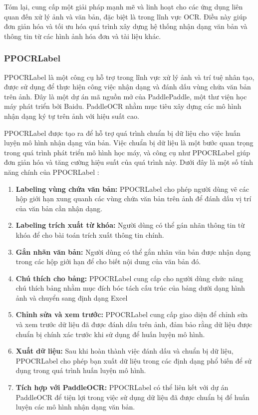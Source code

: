 Tóm lại, cung cấp một giải pháp mạnh mẽ và linh hoạt cho các ứng dụng liên quan đến xử lý ảnh và văn bản, đặc biệt là trong lĩnh vực OCR. Điều này giúp đơn giản hóa và tối ưu hóa quá trình xây dựng hệ thống nhận dạng văn bản và thông tin từ các hình ảnh hóa đơn và tài liệu khác.

\subsubsection{PPOCRLabel}
PPOCRLabel là một công cụ hỗ trợ trong lĩnh vực xử lý ảnh và trí tuệ nhân tạo, được sử dụng để thực hiện công việc nhận dạng và đánh dấu vùng chứa văn bản trên ảnh. Đây là một dự án mã nguồn mở của PaddlePaddle, một thư viện học máy phát triển bởi Baidu. PaddleOCR nhằm mục tiêu xây dựng các mô hình nhận dạng ký tự trên ảnh với hiệu suất cao.

PPOCRLabel được tạo ra để hỗ trợ quá trình chuẩn bị dữ liệu cho việc huấn luyện mô hình nhận dạng văn bản. Việc chuẩn bị dữ liệu là một bước quan trọng trong quá trình phát triển mô hình học máy, và công cụ như PPOCRLabel giúp đơn giản hóa và tăng cường hiệu suất của quá trình này. Dưới đây là một số tính năng chính của PPOCRLabel \cite{ppocrlabel}:
\begin{enumerate}
    \item \textbf{Labeling vùng chứa văn bản:} PPOCRLabel cho phép người dùng vẽ các hộp giới hạn xung quanh các vùng chứa văn bản trên ảnh để đánh dấu vị trí của văn bản cần nhận dạng.
    \item \textbf{Labeling trích xuất từ khóa:} Người dùng có thể gán nhãn thông tin từ khóa để cho bài toán trích xuất thông tin chính.
    \item \textbf{Gắn nhãn văn bản:} Người dùng có thể gắn nhãn văn bản được nhận dạng trong các hộp giới hạn để cho biết nội dung của văn bản đó.
    \item \textbf{Chú thích cho bảng:} PPOCRLabel cung cấp cho người dùng chức năng chú thích bảng nhằm mục đích bóc tách cấu trúc của bảng dưới dạng hình ảnh và chuyển sang định dạng Excel
    \item \textbf{Chỉnh sửa và xem trước:} PPOCRLabel cung cấp giao diện để chỉnh sửa và xem trước dữ liệu đã được đánh dấu trên ảnh, đảm bảo rằng dữ liệu được chuẩn bị chính xác trước khi sử dụng để huấn luyện mô hình.
    \item \textbf{Xuất dữ liệu:} Sau khi hoàn thành việc đánh dấu và chuẩn bị dữ liệu, PPOCRLabel cho phép bạn xuất dữ liệu trong các định dạng phổ biến để sử dụng trong quá trình huấn luyện mô hình.
    \item \textbf{Tích hợp với PaddleOCR:} PPOCRLabel có thể liên kết với dự án PaddleOCR để tiện lợi trong việc sử dụng dữ liệu đã được chuẩn bị để huấn luyện các mô hình nhận dạng văn bản.
\end{enumerate}


